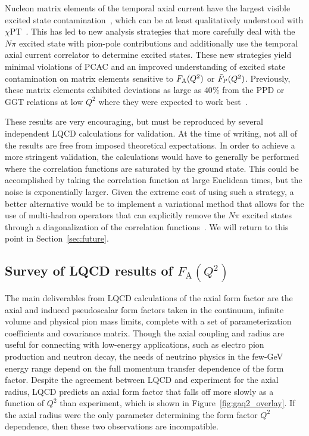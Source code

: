 \documentclass{ar-1col}
\begin{document}
Nucleon matrix elements of the temporal axial current have the largest visible excited state contamination~\cite{Jang:2019vkm,RQCD:2019jai}, which can be at least qualitatively understood with $\chi$PT~\cite{Bar:2018xyi}.
This has led to new analysis strategies that more carefully deal with the $N\pi$ excited state with pion-pole contributions and additionally use the temporal axial current correlator to determine excited states.
These new strategies yield minimal violations of PCAC and an improved understanding of excited state contamination on matrix elements sensitive to $F_{\rm A}(Q^2)$ or $\tilde{F}_{\rm P}(Q^2)$.
Previously, these matrix elements exhibited deviations as large as $40\%$ from the PPD or GGT
 relations at low $Q^2$ where they were expected to work best~\cite{Bali:2014nma,Gupta:2017dwj}.


These results are very encouraging,
 but must be reproduced by several independent LQCD calculations for validation.
At the time of writing,
 not all of the results are free from imposed theoretical expectations.
In order to achieve a more stringent validation, the calculations would have to generally be performed where the correlation functions are saturated by the ground state.
This could be accomplished by taking the correlation function at large Euclidean times,
 but the noise is exponentially larger.
Given the extreme cost of using such a strategy, a better alternative would be to implement a variational method that allows for the use of multi-hadron operators that can explicitly remove the $N\pi$ excited states through a diagonalization of the correlation functions~\cite{Blossier:2009kd}.  We will return to this point in Section~\ref{sec:future}.


\subsection{Survey of LQCD results of $F_{\mathrm{A}}(Q^2)$\label{sec:lqcd_results}}

The main deliverables from LQCD calculations of the axial form factor
 are the axial and induced pseudoscalar form factors taken in the continuum,
 infinite volume and physical pion mass limits, complete with a set of parameterization coefficients
 and covariance matrix.
Though the axial coupling
 and radius are useful for connecting with low-energy applications,
 such as electro pion production and neutron decay,
 the needs of neutrino physics in the few-GeV energy range depend
 on the full momentum transfer dependence of the form factor.
Despite the agreement between LQCD and experiment for the axial radius,
 LQCD predicts an axial form factor that falls off more slowly as a function of $Q^2$ than experiment,
 which is shown in Figure~\ref{fig:gaq2_overlay}.
If the axial radius were the only parameter determining the form factor $Q^2$ dependence,
 then these two observations are incompatible.
\end{document}
